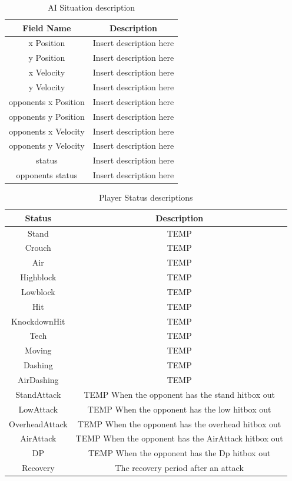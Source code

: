 \documentclass{article}
\begin{document}
\begin{table}[h]
	\centering
	\caption{AI Situation description}
	\begin{tabular}{| c | c |}
		\hline
		Field Name & Description \\
		\hline
		x Position        & Insert description here 	\\
		\hline
		y Position        & Insert description here 	\\
		\hline
		x Velocity        & Insert description here 	\\
		\hline
		y Velocity        & Insert description here 	\\
		\hline
		opponents x Position        & Insert description here 	\\
		\hline
		opponents y Position        & Insert description here 	\\
		\hline
		opponents x Velocity        & Insert description here 	\\
		\hline
		opponents y Velocity        & Insert description here 	\\
		\hline
		status        & Insert description here 	\\
		\hline
		opponents status        & Insert description here 	\\
		\hline
	\end{tabular}
	\label{gamestate}
\end{table}

\begin{table}[h]
	\centering
	\caption{Player Status descriptions}
	\begin{tabular}{| c | c |}
		\hline
		Status & Description \\
		\hline
		Stand & TEMP \\
		\hline
		Crouch & TEMP \\
		\hline
		Air & TEMP \\
		\hline
		Highblock & TEMP \\
		\hline
		Lowblock & TEMP \\
		\hline
		Hit & TEMP \\
		\hline
		KnockdownHit & TEMP \\
		\hline
		Tech & TEMP \\
		\hline
		Moving & TEMP \\
		\hline
		Dashing & TEMP \\
		\hline
		AirDashing & TEMP \\
		\hline
		StandAttack & TEMP When the opponent has the stand hitbox out\\
		\hline 
		LowAttack & TEMP When the opponent has the low hitbox out\\
		\hline 
		OverheadAttack & TEMP When the opponent has the overhead hitbox out\\
		\hline 
		AirAttack & TEMP  When the opponent has the AirAttack hitbox out\\
		\hline
		DP& TEMP When the opponent has the Dp hitbox out\\
		\hline 
		Recovery & The recovery period after an attack\\
		\hline
	\end{tabular}
\end{table}
\end{document}
